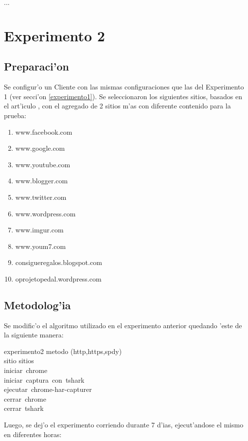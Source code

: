 \documentclass[a4paper,11pt,twocolumn]{article}
\begin{document}
...

\section{Experimento 2}
\label{experimento2}
\subsection{Preparaci'on}

Se configur'o un Cliente con las mismas configuraciones que las del Experimento 1 (ver secci'on \ref{experimento1}). Se seleccionaron los siguientes sitios, basados en el art'iculo \cite{effectSPDY}, con el agregado de 2 sitios m'as con diferente contenido para la prueba:
\begin{enumerate}
\item www.facebook.com
\item www.google.com
\item www.youtube.com
\item www.blogger.com
\item www.twitter.com
\item www.wordpress.com
\item www.imgur.com
\item www.youm7.com
\item consigueregalos.blogspot.com
\item oprojetopedal.wordpress.com
\end{enumerate}

\subsection{Metodolog'ia}

Se modific'o el algoritmo utilizado en el experimento anterior quedando 'este de la siguiente manera:

\begin{pseudocode}{experimento2}{ }
\FOR metodo \in (http,https,spdy) \DO \\
\BEGIN
	\FOR sitio \in sitios \DO \\
	\BEGIN
		iniciar\ chrome\\
		iniciar\ captura\ con\ tshark\\
		ejecutar\ chrome-har-capturer\\
		cerrar\ chrome\\
		cerrar\ tshark
	\END
\END
\end{pseudocode}

Luego, se dej'o el experimento corriendo durante 7 d'ias, ejecut'andose el mismo en diferentes horas:
\end{document}
